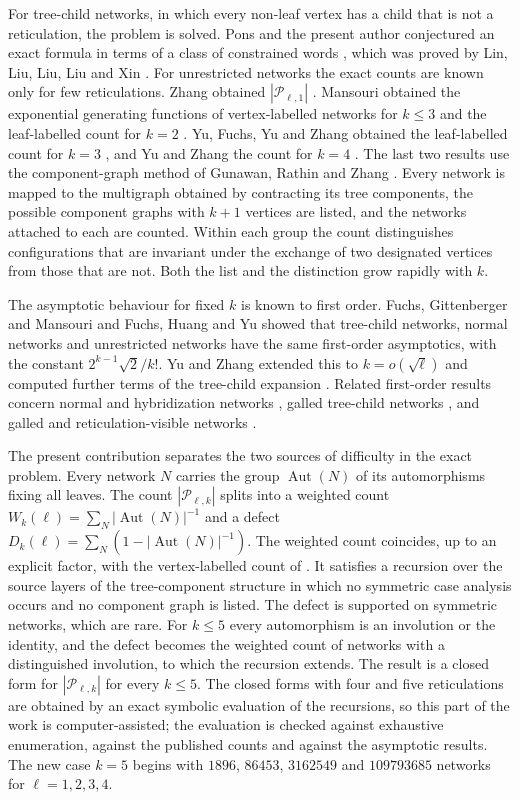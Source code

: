 \documentclass[11pt,a4paper]{article}
\theoremstyle{definition}
\newcommand{\Aut}{\operatorname{Aut}}
\newcommand{\cP}{\mathcal{P}}
\begin{document}
For tree-child networks, in which every non-leaf vertex has a child that is not a reticulation, the problem is solved. Pons and the present author conjectured an exact formula in terms of a class of constrained words \cite{PonsBatle21}, which was proved by Lin, Liu, Liu, Liu and Xin \cite{Lin26}. For unrestricted networks the exact counts are known only for few reticulations. Zhang obtained $|\cP_{\ell,1}|$ \cite{Zhang19}. Mansouri obtained the exponential generating functions of vertex-labelled networks for $k\le3$ and the leaf-labelled count for $k=2$ \cite{Mansouri22}. Yu, Fuchs, Yu and Zhang obtained the leaf-labelled count for $k=3$ \cite{Yu26}, and Yu and Zhang the count for $k=4$ \cite{YuZhang26}. The last two results use the component-graph method of Gunawan, Rathin and Zhang \cite{GRZ20}. Every network is mapped to the multigraph obtained by contracting its tree components, the possible component graphs with $k+1$ vertices are listed, and the networks attached to each are counted. Within each group the count distinguishes configurations that are invariant under the exchange of two designated vertices from those that are not. Both the list and the distinction grow rapidly with $k$.

The asymptotic behaviour for fixed $k$ is known to first order. Fuchs, Gittenberger and Mansouri \cite{FGM19} and Fuchs, Huang and Yu \cite{FHY} showed that tree-child networks, normal networks and unrestricted networks have the same first-order asymptotics, with the constant $2^{k-1}\sqrt2/k!$. Yu and Zhang extended this to $k=o(\sqrt\ell)$ and computed further terms of the tree-child expansion \cite{YZasym}. Related first-order results concern normal and hybridization networks \cite{FSZ}, galled tree-child networks \cite{CFY}, and galled and reticulation-visible networks \cite{ChangFuchs24}.

The present contribution separates the two sources of difficulty in the exact problem. Every network $N$ carries the group $\Aut(N)$ of its automorphisms fixing all leaves. The count $|\cP_{\ell,k}|$ splits into a weighted count $W_k(\ell)=\sum_N|\Aut(N)|^{-1}$ and a defect $D_k(\ell)=\sum_N(1-|\Aut(N)|^{-1})$. The weighted count coincides, up to an explicit factor, with the vertex-labelled count of \cite{Mansouri22}. It satisfies a recursion over the source layers of the tree-component structure in which no symmetric case analysis occurs and no component graph is listed. The defect is supported on symmetric networks, which are rare. For $k\le5$ every automorphism is an involution or the identity, and the defect becomes the weighted count of networks with a distinguished involution, to which the recursion extends. The result is a closed form for $|\cP_{\ell,k}|$ for every $k\le5$. The closed forms with four and five reticulations are obtained by an exact symbolic evaluation of the recursions, so this part of the work is computer-assisted; the evaluation is checked against exhaustive enumeration, against the published counts and against the asymptotic results. The new case $k=5$ begins with $1896$, $86453$, $3162549$ and $109793685$ networks for $\ell=1,2,3,4$.
\end{document}
